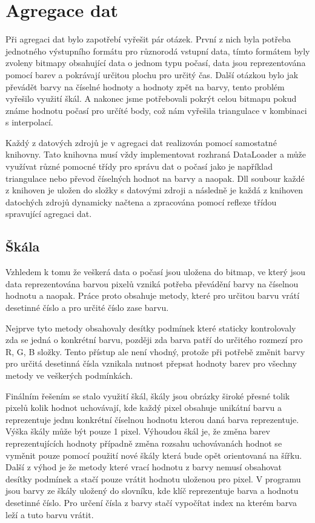 \documentclass[czech,bachelor,dept460,male,csharp,cpdeclaration]{diploma}
\begin{document}
	\chapter{Agregace dat}
	
	Při agregaci dat bylo zapotřebí vyřešit pár otázek. První z nich byla potřeba jednotného výstupního formátu pro různorodá vstupní data, tímto formátem byly zvoleny bitmapy obsahující data o jednom typu počasí, data jsou reprezentována pomocí barev a pokrávají určitou plochu pro určitý čas. Další otázkou bylo jak převádět barvy na číselné hodnoty a hodnoty zpět na barvy, tento problém vyřešilo využití škál. A nakonec jsme potřebovali pokrýt celou bitmapu pokud známe hodnotu počasí pro určíté body, což nám vyřešila triangulace v kombinaci s interpolací.
	
	Každý z datových zdrojů je v agregaci dat realizován pomocí samostatné knihovny. Tato knihovna musí vždy implementovat rozhraná DataLoader a může využívat různé pomocné třídy pro správu dat o počasí jako je například triangulace nebo převod číselných hodnot na barvy a naopak. Dll soubour každé z knihoven je uložen do složky s datovými zdroji a následně je každá z knihoven datochých zdrojů dynamicky načtena a zpracována pomocí reflexe třídou spravující agregaci dat.
	
	\section{Škála}
	
	Vzhledem k tomu že veškerá data o počasí jsou uložena do bitmap, ve který jsou data reprezentována barvou pixelů vzniká potřeba převádění barvy na číselnou hodnotu a naopak. Práce proto obsahuje metody, které pro určitou barvu vrátí desetinné číslo a pro určité číslo zase barvu.
	
	Nejprve tyto metody obsahovaly desítky podmínek které staticky kontrolovaly zda se jedná o konkrétní barvu, později zda barva patří do určitého rozmezí pro R, G, B složky. Tento přístup ale není vhodný, protože při potřebě změnit barvy pro určitá desetinná čísla vznikala nutnost přepsat hodnoty barev pro všechny metody ve veškerých podmínkách.
	
	Finálním řešením se stalo využití škál, škály jsou obrázky široké přesné tolik pixelů kolik hodnot uchovávají, kde každý pixel obsahuje unikátní barvu a reprezentuje jednu konkrétní číselnou hodnotu kterou daná barva reprezentuje. Výška škály může být pouze 1 pixel. Výhoudou škál je, že změna barev reprezentujících hodnoty případně změna rozsahu uchovávanách hodnot se vyměnit pouze pomocí použití nové škály která bude opět orientovaná na šířku. Další z výhod je že metody které vrací hodnotu z barvy nemusí obsahovat desítky podmínek a stačí pouze vrátit hodnotu uloženou pro pixel. V programu jsou barvy ze škály uložený do slovníku, kde klíč reprezentuje barva a hodnotu desetinné číslo. Pro určení čísla z barvy stačí vypočítat index na kterém barva leží a tuto barvu vrátit.
	
\end{document}
